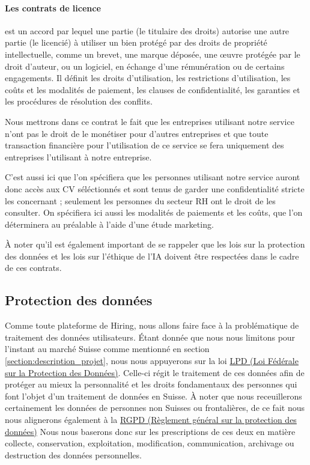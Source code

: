 \paragraph{Les contrats de licence} est un accord par lequel une partie (le titulaire des droits) autorise une autre partie (le licencié) à utiliser un bien protégé par des droits de propriété intellectuelle, comme un brevet, une marque déposée, une œuvre protégée par le droit d'auteur, ou un logiciel, en échange d'une rémunération ou de certains engagements. Il définit les droits d'utilisation, les restrictions d'utilisation, les coûts et les modalités de paiement, les clauses de confidentialité, les garanties et les procédures de résolution des conflits.

Nous mettrons dans ce contrat le fait que les entreprises utilisant notre service n'ont pas le droit de le monétiser pour d'autres entreprises et que toute transaction financière pour l'utilisation de ce service se fera uniquement des entreprises l'utilisant à notre entreprise. \newline

C'est aussi ici que l'on spécifiera que les personnes utilisant notre service auront donc accès aux CV séléctionnés et sont tenus de garder une confidentialité stricte les concernant ; seulement les personnes du secteur RH ont le droit de les consulter. On spécifiera ici aussi les modalités de paiements et les coûts, que l'on déterminera au préalable à l'aide d'une étude marketing.

À noter qu'il est également important de se rappeler que les lois sur la protection des données et les lois sur l'éthique de l'IA doivent être respectées dans le cadre de ces contrats.



\subsection{Protection des données}\label{subsection:protection_des_donnees}

 Comme toute plateforme de Hiring, nous allons faire face à la problématique de traitement des données utilisateurs. Étant donnée que nous nous limitons pour l'instant au marché Suisse comme mentionné en section \ref{section:description_projet}, nous nous appuyerons sur la loi \href{https://www.fedlex.admin.ch/eli/cc/1993/1945_1945_1945/fr}{LPD (Loi Fédérale sur la Protection des Données)}. Celle-ci régit le traitement de ces données afin de protéger au mieux la personnalité et les droits fondamentaux des personnes qui font l’objet d’un traitement de données en Suisse. À noter que nous receuillerons certainement les données de personnes non Suisses ou frontalières, de ce fait nous nous alignerons également à la \href{https://www.edoeb.admin.ch/edoeb/fr/home/documentation/datenschutz/Datenschutz%20-%20International/DSGVO.html}{ RGPD (Règlement général sur la protection des données)}\newline 
Nous nous baserons donc sur les prescriptions de ces deux en matière collecte, conservation, exploitation, modification,  communication, archivage ou destruction des données personnelles.\newline

